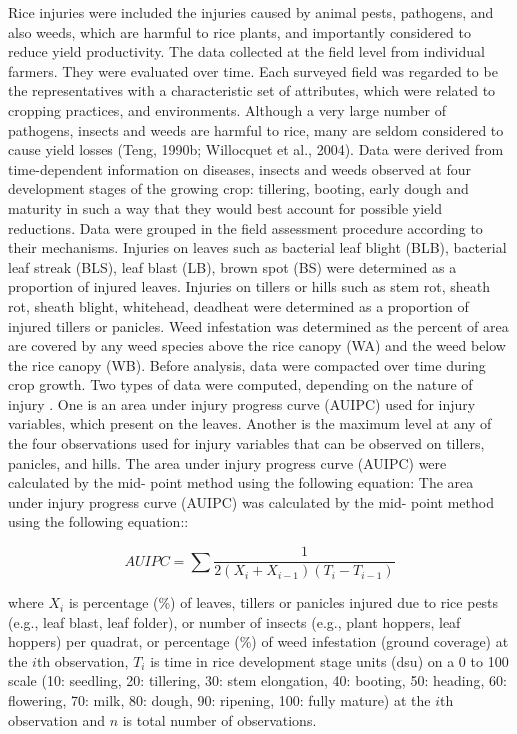 Rice injuries were included the injuries caused by animal pests, pathogens, and also weeds, which are harmful to rice plants, and importantly considered to reduce yield productivity. The data collected at the field level from individual farmers. They were evaluated over time. Each surveyed field was regarded to be the representatives with a characteristic set of attributes, which were related to cropping practices, and environments. Although a very large number of pathogens, insects and weeds are harmful to rice, many are seldom considered to cause yield losses (Teng, 1990b; Willocquet et al., 2004). Data were derived from time-dependent information on diseases, insects and weeds observed at four development stages of the growing crop: tillering, booting, early dough and maturity in such a way that they would best account for possible yield reductions. Data were grouped in the field assessment procedure according to their mechanisms. Injuries on leaves such as bacterial leaf blight (BLB), bacterial leaf streak (BLS), leaf blast (LB), brown spot (BS) were determined as a proportion of injured leaves. Injuries on tillers or hills such as stem rot, sheath rot, sheath blight, whitehead, deadheat were determined as a proportion of injured tillers or panicles. Weed infestation was determined as the percent of area are covered by any weed species above the rice canopy (WA) and the weed below the rice canopy (WB). Before analysis, data were compacted over time during crop growth. Two types of data were computed, depending on the nature of injury . One is an area under injury progress curve (AUIPC) used for injury variables, which present on the leaves. Another is the maximum level at any of the four observations used for injury variables that can be observed on tillers, panicles, and hills. The area under injury progress curve (AUIPC) \citep{Campbell_1990_Introduction} were calculated by the mid- point method using the following equation: The area under injury progress curve (AUIPC) was calculated by the mid- point method using the following equation::

\begin{equation}
AUIPC = \sum{\frac{1}{2(X_{i} + X_{i-1})(T_{i} - T_{i-1})}}
\end{equation}

where $X_i$ is percentage (\%) of leaves, tillers or panicles injured due to rice pests (e.g., leaf blast, leaf folder), or number of insects (e.g., plant hoppers, leaf hoppers) per quadrat, or percentage (\%) of weed infestation (ground coverage) at the $i$th observation, $T_i$ is time in rice development stage units (dsu) on a 0 to 100 scale (10: seedling, 20: tillering, 30: stem elongation, 40: booting, 50: heading, 60: flowering, 70: milk, 80: dough, 90: ripening, 100: fully mature) at the $i$th observation and $n$ is total number of observations.
